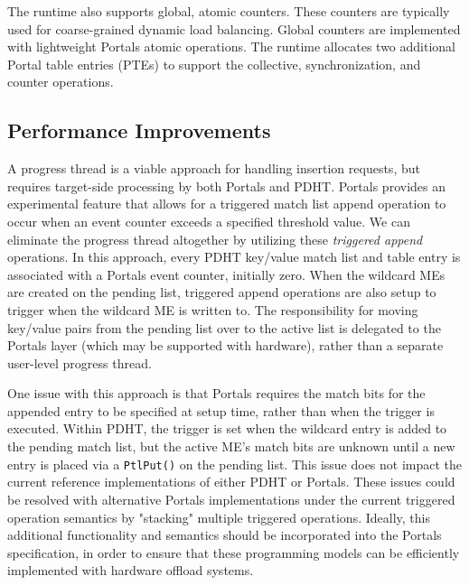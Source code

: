 The runtime also supports global, atomic counters. These counters are typically
used for coarse-grained dynamic load balancing. Global counters are implemented
with lightweight Portals atomic operations. The runtime allocates two
additional Portal table entries (PTEs) to support the collective,
synchronization, and counter operations. 

\subsection{Performance Improvements}
\label{sec:ptl-ext}

{} A progress thread is a viable
approach for handling insertion requests, but requires target-side processing
by both Portals and PDHT. Portals provides an experimental feature that allows
for a triggered match list append operation to occur when an event counter
exceeds a specified threshold value. We can eliminate the progress thread
altogether by utilizing these {\em triggered append} operations. In this
approach, every PDHT key/value match list and table entry is associated with a
Portals event counter, initially zero.  When the wildcard MEs are created on
the pending list, triggered append operations are also setup to trigger when
the wildcard ME is written to. The responsibility for moving key/value pairs
from the pending list over to the active list is delegated to the Portals layer
(which may be supported with hardware), rather than a separate user-level
progress thread. 

One issue with this approach is that Portals requires the match bits for the
appended entry to be specified at setup time, rather than when the trigger is
executed. Within PDHT, the trigger is set when the wildcard entry is added to
the pending match list, but the active ME's match bits are unknown until a new
entry is placed via a {\tt PtlPut()} on the pending list. This issue does not
impact the current reference implementations of either PDHT or Portals. These
issues could be resolved with alternative Portals implementations under the
current triggered operation semantics by "stacking" multiple triggered
operations. Ideally, this additional functionality and semantics should be
incorporated into the Portals specification, in order to ensure that these
programming models can be efficiently implemented with hardware offload
systems.\\


